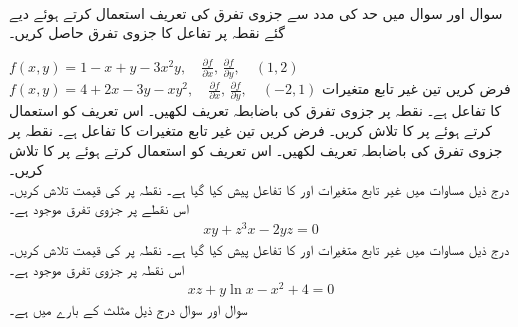 \\
سوال  اور سوال  میں  حد کی مدد سے جزوی تفرق کی تعریف  استعمال کرتے ہوئے دیے گئے نقطہ پر تفاعل کا جزوی تفرق حاصل کریں۔

$f(x,y)=1-x+y-3x^2y,\quad \frac{\partial f}{\partial x},\,\frac{\partial f}{\partial y},\quad (1,2)$
$f(x,y)=4+2x-3y-xy^2,\quad \frac{\partial f}{\partial x},\,\frac{\partial f}{\partial y},\quad (-2,1)$
فرض کریں  تین غیر تابع متغیرات کا تفاعل ہے۔ نقطہ  پر جزوی تفرق   کی باضابطہ تعریف  لکھیں۔ اس تعریف کو استعمال کرتے ہوئے  پر  کا  تلاش کریں۔
فرض کریں  تین غیر تابع متغیرات کا تفاعل ہے۔ نقطہ  پر جزوی تفرق   کی باضابطہ تعریف  لکھیں۔ اس تعریف کو استعمال کرتے ہوئے  پر  کا  تلاش کریں۔
\\
درج  ذیل مساوات  میں     غیر تابع متغیرات  اور  کا تفاعل  پیش کیا گیا ہے۔ نقطہ  پر  کی قیمت تلاش کریں۔ اس نقطے  پر     جزوی تفرق  موجود ہے۔  
\begin{align*}
xy+z^3x-2yz=0
\end{align*}
درج  ذیل مساوات  میں     غیر تابع متغیرات  اور  کا تفاعل  پیش کیا گیا ہے۔ نقطہ  پر  کی قیمت تلاش کریں۔ اس نقطہ پر     جزوی تفرق  موجود ہے۔  
\begin{align*}
xz+y\ln x-x^2+4=0
\end{align*}
سوال  اور سوال  درج ذیل مثلث  کے بارے میں ہے۔
\begin{center}
\end{center}

